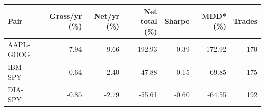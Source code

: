 \begin{tabular}{@{}lrrrrrr@{}}
\toprule
Pair & Gross/yr (\%) & Net/yr (\%) & Net total (\%) & Sharpe & MDD* (\%) & Trades \\
\midrule
AAPL-GOOG & -7.94 & -9.66 & -192.93 & -0.39 & -172.92 & 170 \\
IBM-SPY & -0.64 & -2.40 & -47.88 & -0.15 & -69.85 & 175 \\
DIA-SPY & -0.85 & -2.79 & -55.61 & -0.60 & -64.55 & 192 \\
\bottomrule
\end{tabular}
